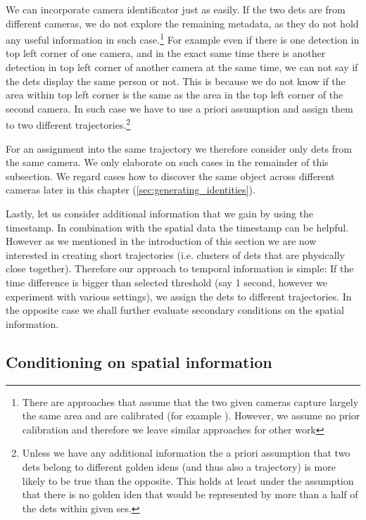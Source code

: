 We can incorporate camera identificator just as easily. If the two
\glspl{det} are from different cameras, we do not explore the remaining
metadata, as they do not hold any useful information in such
case.\footnote{There
are approaches that assume that the two given cameras capture largely the same
area and are calibrated (for example \cite{hu2006principal}). However, we
assume no prior calibration and therefore we leave similar approaches for other
work} For example even if there is one detection in top left corner of one
camera, and in the exact same time there is another detection in top left corner
of another camera at the same time, we can not say if the \glspl{det}
display the same person or not. This is
because we do not know if the area within top left corner is the same as the
area in the top left corner of the second camera. In such case we have to use
a priori assumption and assign them to two different
trajectories.\footnote{Unless we have any additional information the a priori
assumption that two \glspl{det} belong to different golden \glspl{iden} (and thus also a trajectory) is more
likely to be true than the opposite. This holds at least under the assumption that there is no
golden \gls{iden} that would be represented by more than a half of the
\glspl{det} within given \gls{ses}.}

For an assignment into the same trajectory we therefore consider only \glspl{det}
from the same camera. We only elaborate on such cases in the remainder
of this subsection. We regard cases how to discover the same object across
different cameras later in this chapter (\autoref{sec:generating_identities}).

Lastly, let us consider additional information that we gain by using the timestamp.
In combination with the spatial data the timestamp can be helpful. However as
we mentioned in the introduction of this section
we are now interested in creating short trajectories (i.e. clusters of
\glspl{det} that are physically close together). Therefore
our approach to temporal information is simple: If the time difference is
bigger than selected threshold (say 1 second, however we experiment with
various settings), we assign the \glspl{det} to different trajectories. In the
opposite case we shall further evaluate secondary conditions on the spatial
information.

\subsection{Conditioning on spatial information}

